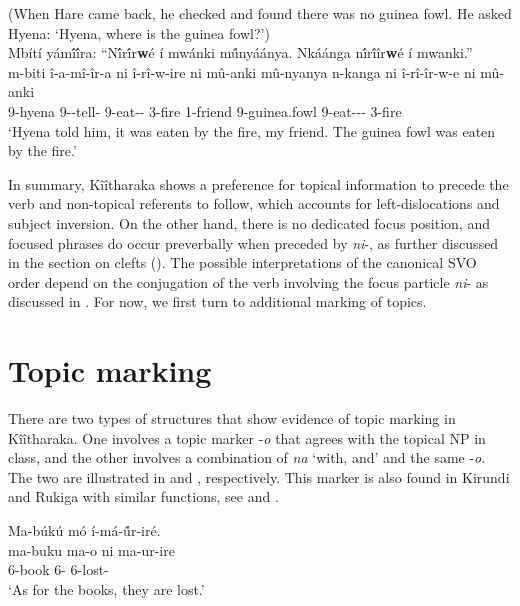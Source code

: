 \documentclass[output=paper]{langscibook}
\begin{document}
\ea
\label{bkm:Ref131610085}
(When Hare came back, he checked and found there was no guinea fowl. He asked Hyena: ‘Hyena, where is the guinea fowl?’)\\
Mbítí yám\'{î}\'{î}ra: “N\'{î}r\'{î}r\textbf{w}é í mwánki m\'{û}nyáánya. Nkáánga n\'{î}r\'{î}îr\textbf{w}é í mwanki.”\\
\gll
m-biti  î-a-mî-îr-a  ni  î-rî-w-ire  ni  mû-anki  mû-nyanya n-kanga  ni  î-rî-îr-w-e  ni  mû-anki \\
9-hyena 9\SM-\OM{}-tell-\FV{} \FOC{} 9\SM{}-eat-\PASS-\PFV{} \FOC{} 3-fire  1-friend 9-guinea.fowl \FOC{} 9\SM{}-eat-\APPL-\PASS-\FV{} \FOC{} 3-fire \\
\glt
‘Hyena told him, it was eaten by the fire, my friend. The guinea fowl was eaten by the fire.’

\z

In summary, Kîîtharaka shows a preference for topical information to precede the verb and non-topical referents to follow, which accounts for left-dislocations and subject inversion. On the other hand, there is no dedicated focus position, and focused phrases do occur preverbally when preceded by \textit{ni}-, as further discussed in the section on clefts (). The possible interpretations of the canonical SVO order depend on the conjugation of the verb involving the focus particle \textit{ni}- as discussed in . For now, we first turn to additional marking of topics.

\section{Topic marking}
\label{bkm:Ref115790636}
There are two types of structures that show evidence of topic marking in Kîîtharaka. One involves a topic marker -\textit{o} that agrees with the topical NP in class, and the other involves a combination of \textit{na} ‘with, and’ and the same -\textit{o}. The two are illustrated in  and , respectively. This marker is also found in Kirundi and Rukiga with similar functions, see \textcite{chapters/kirundi} and \textcite{chapters/rukiga}.

\ea
\label{bkm:Ref94509521}
Ma-búkú   mó   í-má-\'{û}r-iré.\\
\gll
ma-buku  ma-o  ni  ma-ur-ire\\
6-book  6-\PRO{} \FOC{}  6\SM{}-lost-\PFV{}\\
\glt
‘As for the books, they are lost.’
\end{document}
